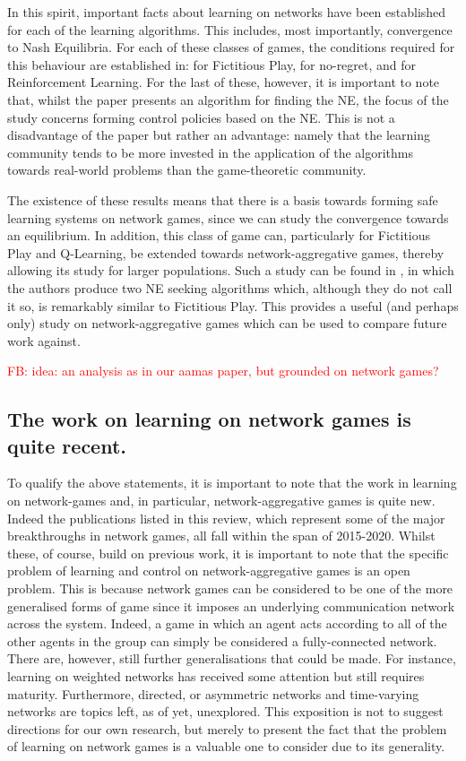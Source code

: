 \documentclass{article}
\newcommand{\fb}[1]{\textcolor{red}{FB: #1}}
\begin{document}
In this spirit, important facts about learning on networks have been
established for each of the learning algorithms. This includes, most
importantly, convergence to Nash Equilibria. For each of these classes
of games, the conditions required for this behaviour are established
in: \cite{Ewerhart2019} for Fictitious Play, \cite{Nagarajan2018} for
no-regret, and \cite{Li2017} for Reinforcement Learning. For the last
of these, however, it is important to note that, whilst the paper
presents an algorithm for finding the NE, the focus of the study
concerns forming control policies based on the NE. This is not a
disadvantage of the paper but rather an advantage: namely that the
learning community tends to be more invested in the application of the
algorithms towards real-world problems than the game-theoretic
community.

The existence of these results means that there is a basis towards
forming safe learning systems on network games, since we can study the
convergence towards an equilibrium. In addition, this class of game
can, particularly for Fictitious Play and Q-Learning, be extended
towards network-aggregative games, thereby allowing its study for
larger populations. Such a study can be found in \cite{Parise}, in
which the authors produce two NE seeking algorithms which, although
they do not call it so, is remarkably similar to Fictitious Play. This
provides a useful (and perhaps only) study on network-aggregative
games which can be used to compare future work against.

\fb{idea: an analysis as in our aamas paper, but grounded on network games?}

\subsection*{The work on learning on network games is quite recent.} 

To qualify the above statements, it is important to note that the work
in learning on network-games and, in particular, network-aggregative
games is quite new. Indeed the publications listed in this review,
which represent some of the major breakthroughs in network games, all
fall within the span of 2015-2020. Whilst these, of course, build on
previous work, it is important to note that the specific problem of
learning and control on network-aggregative games is an open
problem. This is because network games can be considered to be one of
the more generalised forms of game since it imposes an underlying
communication network across the system. Indeed, a game in which an
agent acts according to all of the other agents in the group can
simply be considered a fully-connected network. There are, however,
still further generalisations that could be made. For instance,
learning on weighted networks has received some attention
\cite{Bayer2019} but still requires maturity. Furthermore, directed,
or asymmetric networks and time-varying networks are topics left, as
of yet, unexplored. This exposition is not to suggest directions for
our own research, but merely to present the fact that the problem of
learning on network games is a valuable one to consider due to its
generality.
\end{document}
